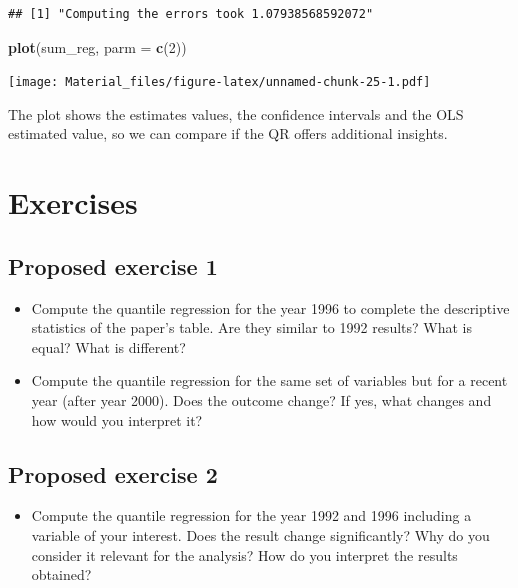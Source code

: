 \documentclass[]{book}
\newenvironment{Shaded}{\begin{snugshade}}{\end{snugshade}}
\newcommand{\KeywordTok}[1]{\textcolor[rgb]{0.13,0.29,0.53}{\textbf{#1}}}
\newcommand{\DataTypeTok}[1]{\textcolor[rgb]{0.13,0.29,0.53}{#1}}
\newcommand{\DecValTok}[1]{\textcolor[rgb]{0.00,0.00,0.81}{#1}}
\newcommand{\NormalTok}[1]{#1}
\providecommand{\tightlist}{%
  \setlength{\itemsep}{0pt}\setlength{\parskip}{0pt}}
\begin{document}
\begin{verbatim}
## [1] "Computing the errors took 1.07938568592072"
\end{verbatim}

\begin{Shaded}
\begin{Highlighting}[]
\KeywordTok{plot}\NormalTok{(sum_reg, }\DataTypeTok{parm =} \KeywordTok{c}\NormalTok{(}\DecValTok{2}\NormalTok{))}
\end{Highlighting}
\end{Shaded}

\texttt{[image: Material\_files/figure-latex/unnamed-chunk-25-1.pdf]}

The plot shows the estimates values, the confidence intervals and the
OLS estimated value, so we can compare if the QR offers additional
insights.

\section{Exercises}\label{exercises}

\subsection{Proposed exercise 1}\label{proposed-exercise-1}

\begin{itemize}
\tightlist
\item
  Compute the quantile regression for the year 1996 to complete the
  descriptive statistics of the paper's table. Are they similar to 1992
  results? What is equal? What is different?
\item
  Compute the quantile regression for the same set of variables but for
  a recent year (after year 2000). Does the outcome change? If yes, what
  changes and how would you interpret it?
\end{itemize}

\subsection{Proposed exercise 2}\label{proposed-exercise-2}

\begin{itemize}
\tightlist
\item
  Compute the quantile regression for the year 1992 and 1996 including a
  variable of your interest. Does the result change significantly? Why
  do you consider it relevant for the analysis? How do you interpret the
  results obtained?
\end{itemize}
\end{document}
